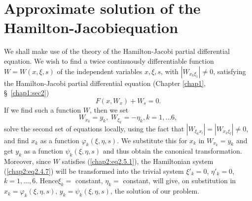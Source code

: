 \section[Approximate solution of the Hamilton-Jacobi...]{Approximate solution of the Hamilton-Jacobi\hfil\break equation}\label{chap2:sec5}
We shall make use of the theory of the Hamilton-Jacobi partial differential equation. We wish to find a twice continuously differentiable function $W = W(x, \xi, s)$ of the independent variables $x, \xi, s$, with $|W_{x_k \xi_1}| \neq 0$, satisfying the Hamilton-Jacobi partial differential equation (Chapter \ref{chap1}, \S\ \ref{chap1:sec2})
\begin{equation*}
F(x, W_x) + W_s = 0.\tag{2.5.1}\label{chap2:eq2.5.1} 
\end{equation*}
If we find such a function $W$, then we set
$$
W_{x_k} = y_k, \; W_{\xi_k} = - \eta_k, k = 1, \ldots 6,
$$
solve the second set of equations locally, using the fact that $|W_{\xi_k x_l}| = |W_{x_k \xi_l}| \neq 0$, and find $x_k$ as a function $\varphi_k(\xi, \eta, s)$. We substitute this for $x_k$ in $W_{x_k} = y_k$ and get $y_k$ as a function $\psi_k (\xi, \eta, s)$ and thus obtain the canonical transformation. Moreover, since $W$ satisfies (\ref{chap2:eq2.5.1}), the Hamiltonian system (\ref{chap2:eq2.4.7}) will be transformed into the trivial system $\xi'_k = 0$, $\eta'_k = 0$, $k = 1, \ldots, 6$. Hence\pageoriginale $\xi_k = $ constant, $\eta_k = $ constant, will give, on substitution in $x_k = \varphi_k (\xi, \eta, s)$, $y_k = \psi_k(\xi, \eta, s)$, the solution of our problem.

